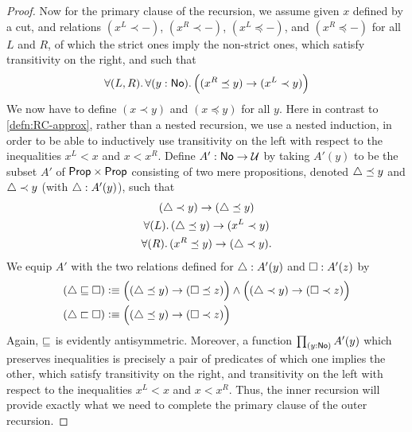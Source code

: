 \begin{proof}
  Now for the primary clause of the recursion, we assume given $x$ defined by a cut, and relations $(x^L \prec -)$, $(x^R \prec -)$, $(x^L \preceq -)$, and $(x^R \preceq -)$ for all $L$ and $R$, of which the strict ones imply the non-strict ones, which satisfy transitivity on the right, and such that
  \begin{equation}\label{eq:NO-prec-outer-IH}
    \fall{L,R}{y:\NO}\Big( (x^R\preceq y) \to (x^L \prec y) \Big)
  \end{equation}
  We now have to define $(x\prec y)$ and $(x\preceq y)$ for all $y$.
  Here in contrast to \autoref{defn:RC-approx}, rather than a nested recursion, we use a nested induction, in order to be able to inductively use transitivity on the left with respect to the inequalities $x^L<x$ and $x<x^R$.
  Define $A':\mathsf{No}\to\mathcal{U}$ by taking $A'(y)$ to be the subset $A'$ of $\mathsf{Prop}\times\mathsf{Prop}$ consisting of two mere propositions, denoted $\triangle\preceq y$ and $\triangle\prec y$ (with $\triangle:A'(y)$), such that
  \begin{gather}
    (\tlt y) \to (\tle y)\\
    \fall{L} (\tle y)\to (x^L\prec y) \label{eq:NO-prec-IHL}\\
    \fall{R} (x^R \preceq y) \to (\tlt y) \label{eq:NO-prec-IHR}.
  \end{gather}
  We equip $A'$ with the two relations defined for $\triangle:A'(y)$ and $\square:A'(z)$ by
  \begin{align*}
    (\tlname \bble \tlbname) &\defeq
    \Big((\tle y) \to (\tleb z)\Big) \land \Big((\tlt y) \to (\tltb z)\Big)\\
    (\tlname \bblt \tlbname) &\defeq
    \Big((\tle y) \to (\tltb z)\Big) %
  \end{align*}
  Again, $\sqsubseteq$ is evidently antisymmetric.
  Moreover, a function $\prd{y:\NO} A'(y)$ which preserves inequalities is precisely a pair of predicates of which one implies the other, which satisfy transitivity on the right, and transitivity on the left with respect to the inequalities $x^L<x$ and $x<x^R$.
  Thus, the inner recursion will provide exactly what we need to complete the primary clause of the outer recursion.


\end{proof}
